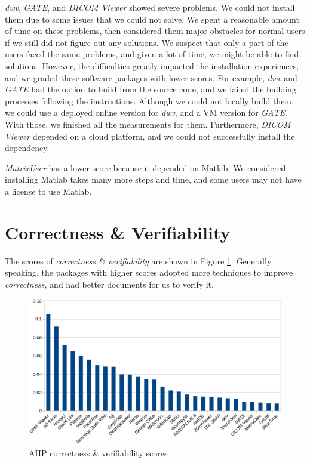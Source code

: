 \textit{dwv}, \textit{GATE}, and \textit{DICOM Viewer} showed severe problems. We could not install them due to some issues that we could not solve. We spent a reasonable amount of time on these problems, then considered them major obstacles for normal users if we still did not figure out any solutions. We suspect that only a part of the users faced the same problems, and given a lot of time, we might be able to find solutions. However, the difficulties greatly impacted the installation experiences, and we graded these software packages with lower scores. For example, \textit{dwv} and \textit{GATE} had the option to build from the source code, and we failed the building processes following the instructions. Although we could not locally build them, we could use a deployed online version for \textit{dwv}, and a VM version for \textit{GATE}. With those, we finished all the measurements for them. Furthermore, \textit{DICOM Viewer} depended on a cloud platform, and we could not successfully install the dependency.

\textit{MatrixUser} has a lower score because it depended on Matlab. We considered installing Matlab takes many more steps and time, and some users may not have a license to use Matlab.

\section{Correctness \& Verifiability}
The scores of \textit{correctness \& verifiability} are shown in Figure \ref{fg_correctness_erifiability_scores}. Generally speaking, the packages with higher scores adopted more techniques to improve \textit{correctness}, and had better documents for us to verify it.

\begin{figure}[H]
\includegraphics[scale=0.38]{figures/correctness_verifiability_scores.png}
\caption{AHP correctness \& verifiability scores}
\label{fg_correctness_erifiability_scores}
\end{figure}

